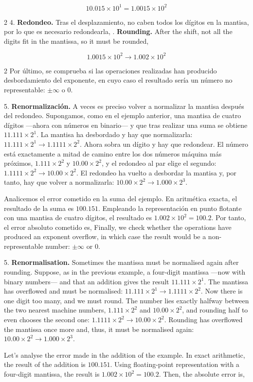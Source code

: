 \begin{equation*}
10.015\times10^1=1.0015\times10^2
\end{equation*}

\begin{paracol}{2}
4. \textbf{Redondeo.} Tras el desplazamiento, no caben todos los dígitos en la mantisa, por lo que es necesario redondearla,
. \textbf{Rounding.} After the shift, not all the digits fit in the mantissa, so it must be rounded,
\end{paracol}
\begin{equation*}
1.0015\times10^2\rightarrow 1.002\times10^2
\end{equation*}
\begin{paracol}{2}
Por último, se comprueba si las operaciones realizadas han producido desbordamiento del exponente, en cuyo caso el resultado sería un número no representable: $\pm\infty$ o $0$.

5. \textbf{Renormalización.} A veces es preciso volver a normalizar la mantisa después del redondeo. Supongamos, como en el ejemplo anterior, una mantisa de cuatro dígitos ---ahora con números en binario--- y que tras realizar una suma se obtiene $11.111\times2^1$. La mantisa ha desbordado y hay que normalizarla: $11.111\times2^1\rightarrow1.1111\times2^2$. Ahora sobra un dígito y hay que redondear. El número está exactamente a mitad de camino entre los dos números máquina más próximos, $1.111\times2^2$ y $10.00\times2^2$, y el redondeo al par elige el segundo: $1.1111\times2^2\rightarrow10.00\times2^2$. El redondeo ha vuelto a desbordar la mantisa y, por tanto, hay que volver a normalizarla: $10.00\times2^2\rightarrow1.000\times2^3$.

Analicemos el error cometido en la suma del ejemplo. En aritmética exacta, el resultado de la suma es $100.151$. Empleando la representación en punto flotante con una mantisa de cuatro dígitos, el resultado es $1.002\times10^2=100.2$. Por tanto, el error absoluto cometido es,
\switchcolumn
Finally, we check whether the operations have produced an exponent overflow, in which case the result would be a non-representable number: $\pm\infty$ or $0$.

5. \textbf{Renormalisation.} Sometimes the mantissa must be normalised again after rounding. Suppose, as in the previous example, a four-digit mantissa ---now with binary numbers--- and that an addition gives the result $11.111\times2^1$. The mantissa has overflowed and must be normalised: $11.111\times2^1\rightarrow1.1111\times2^2$. Now there is one digit too many, and we must round. The number lies exactly halfway between the two nearest machine numbers, $1.111\times2^2$ and $10.00\times2^2$, and rounding half to even chooses the second one: $1.1111\times2^2\rightarrow10.00\times2^2$. Rounding has overflowed the mantissa once more and, thus, it must be normalised again: $10.00\times2^2\rightarrow1.000\times2^3$.

Let's analyse the error made in the addition of the example. In exact arithmetic, the result of the addition is $100.151$. Using floating-point representation with a four-digit mantissa, the result is $1.002\times10^2=100.2$. Then, the absolute error is,
\end{paracol}

